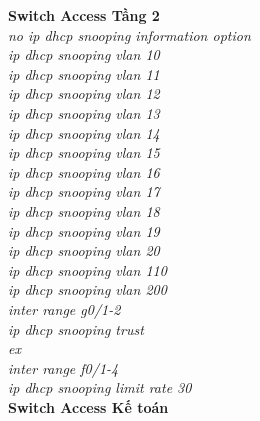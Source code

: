 \documentclass[a4paper, 12pt]{article}
\begin{document}
\hspace*{1cm}\textbf{Switch Access Tầng 2}\\
\hspace*{2cm}\textit{no ip dhcp snooping information option\\
\hspace*{2cm}ip dhcp snooping vlan 10\\
\hspace*{2cm}ip dhcp snooping vlan 11\\
\hspace*{2cm}ip dhcp snooping vlan 12\\
\hspace*{2cm}ip dhcp snooping vlan 13\\
\hspace*{2cm}ip dhcp snooping vlan 14\\
\hspace*{2cm}ip dhcp snooping vlan 15\\
\hspace*{2cm}ip dhcp snooping vlan 16\\
\hspace*{2cm}ip dhcp snooping vlan 17\\
\hspace*{2cm}ip dhcp snooping vlan 18\\
\hspace*{2cm}ip dhcp snooping vlan 19\\
\hspace*{2cm}ip dhcp snooping vlan 20\\
\hspace*{2cm}ip dhcp snooping vlan 110\\
\hspace*{2cm}ip dhcp snooping vlan 200\\
\hspace*{2cm}inter range g0/1-2\\
\hspace*{2cm}ip dhcp snooping trust\\
\hspace*{2cm}ex\\
\hspace*{2cm}inter range f0/1-4\\
\hspace*{2cm}ip dhcp snooping limit rate 30\\}
\hspace*{1cm}\textbf{Switch Access Kế toán}\\
\end{document}
